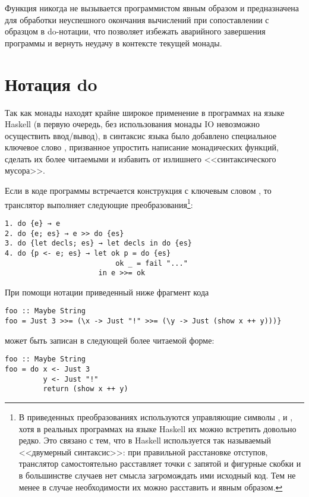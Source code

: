 Функция  никогда не вызывается программистом явным образом и предназначена для обработки неуспешного окончания вычислений при сопоставлении с образцом в do-нотации, что позволяет избежать аварийного завершения программы и вернуть неудачу в контексте текущей монады.

\section{Нотация do}

Так как монады находят крайне широкое применение в программах на языке Haskell (в первую очередь, без использования монады IO невозможно осуществить ввод/вывод), в синтаксис языка было добавлено специальное ключевое слово , призванное упростить написание монадических функций, сделать их более читаемыми и избавить от излишнего <<синтаксического мусора>>.

Если в коде программы встречается конструкция с ключевым словом , то транслятор выполняет следующие преобразования\footnote{В приведенных преобразованиях используются управляющие символы \Code{;}, \Code{\{} и \Code{\}}, хотя в реальных программах на языке Haskell их можно встретить довольно редко. Это связано с тем, что в Haskell используется так называемый <<двумерный синтаксис>>: при правильной расстановке отступов, транслятор самостоятельно расставляет точки с запятой и фигурные скобки и в большинстве случаев нет смысла загромождать ими исходный код. Тем не менее в случае необходимости их можно расставить и явным образом.}:

\begin{verbatim}
1. do {e} → e
2. do {e; es} → e >> do {es}
3. do {let decls; es} → let decls in do {es}
4. do {p <- e; es} → let ok p = do {es}
                          ok _ = fail "..."
                      in e >>= ok
\end{verbatim}

При помощи нотации  приведенный ниже фрагмент кода

\begin{verbatim}
foo :: Maybe String
foo = Just 3 >>= (\x -> Just "!" >>= (\y -> Just (show x ++ y)))}
\end{verbatim}

может быть записан в следующей более читаемой форме:

\begin{verbatim}
foo :: Maybe String
foo = do x <- Just 3 
         y <- Just "!" 
         return (show x ++ y)
\end{verbatim}


